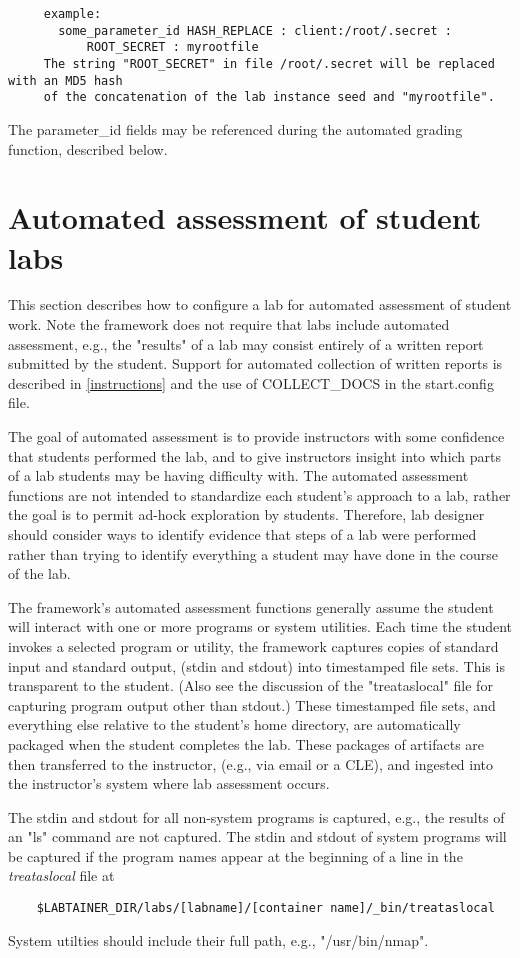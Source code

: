 \documentclass[12pt]{article}
\begin{document}
\begin{verbatim}
     example:
       some_parameter_id HASH_REPLACE : client:/root/.secret : 
           ROOT_SECRET : myrootfile
     The string "ROOT_SECRET" in file /root/.secret will be replaced with an MD5 hash
     of the concatenation of the lab instance seed and "myrootfile".
\end{verbatim}

The parameter\_id fields may be referenced during the automated grading function, described below. 


\section{Automated assessment of student labs}
This section describes how to configure a lab for automated assessment of student work.
Note the framework does not require that labs include automated assessment, e.g., the
"results" of a lab may consist entirely of a written report submitted by the student.
Support for automated collection of written reports is described in \ref{instructions}
and the use of COLLECT\_DOCS in the start.config file.

The goal of automated assessment is to provide instructors with some confidence that 
students performed the lab, and to give instructors insight into which parts
of a lab students may be having difficulty with.  The automated assessment functions are
not intended to standardize each student's approach to a lab, rather the goal is to permit
ad-hock exploration by students.  Therefore, lab designer should consider ways to identify
evidence that steps of a lab were performed rather than trying to identify everything a student
may have done in the course of the lab.

The framework's automated assessment functions generally assume the student will interact with one or
more programs or system utilities.  Each time the student invokes a selected program or utility, the 
framework captures copies of standard input and standard output, (stdin and stdout) into timestamped file sets.
This is transparent to the student.  (Also see the discussion of the "treataslocal" file for capturing
program output other than stdout.)  These timestamped file sets, and everything else relative to
the student's home directory, are automatically packaged when the student completes the lab.
These packages of artifacts are then transferred to the instructor, (e.g., via email or a CLE), and 
ingested into the instructor's system where lab assessment occurs.

The stdin and stdout for all non-system programs is captured, e.g., the results of an "ls" command
are not captured.  The stdin and stdout of system programs will be captured if the program
names appear at the beginning of a line in the \textit{treataslocal} file at
\begin{verbatim}
    $LABTAINER_DIR/labs/[labname]/[container name]/_bin/treataslocal
\end{verbatim}
\noindent System utilties should include their full path, e.g., "/usr/bin/nmap".
\end{document}
